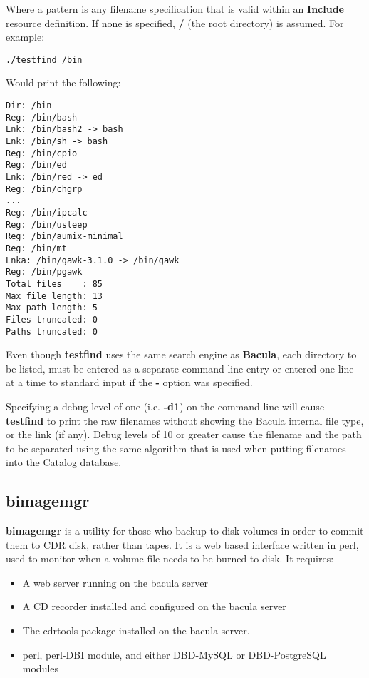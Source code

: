 Where a pattern is any filename specification that is valid within an {\bf
Include} resource definition. If none is specified, {\bf /} (the root
directory) is assumed. For example: 

\footnotesize
\begin{verbatim}
./testfind /bin
\end{verbatim}
\normalsize

Would print the following: 

\footnotesize
\begin{verbatim}
Dir: /bin
Reg: /bin/bash
Lnk: /bin/bash2 -> bash
Lnk: /bin/sh -> bash
Reg: /bin/cpio
Reg: /bin/ed
Lnk: /bin/red -> ed
Reg: /bin/chgrp
...
Reg: /bin/ipcalc
Reg: /bin/usleep
Reg: /bin/aumix-minimal
Reg: /bin/mt
Lnka: /bin/gawk-3.1.0 -> /bin/gawk
Reg: /bin/pgawk
Total files    : 85
Max file length: 13
Max path length: 5
Files truncated: 0
Paths truncated: 0
\end{verbatim}
\normalsize

Even though {\bf testfind} uses the same search engine as {\bf Bacula}, each
directory to be listed, must be entered as a separate command line entry or
entered one line at a time to standard input if the {\bf -} option was
specified. 

Specifying a debug level of one (i.e. {\bf -d1}) on the command line will
cause {\bf testfind} to print the raw filenames without showing the Bacula
internal file type, or the link (if any). Debug levels of 10 or greater cause
the filename and the path to be separated using the same algorithm that is
used when putting filenames into the Catalog database. 

\subsection*{bimagemgr}
\label{bimagemgr}

{\bf bimagemgr} is a utility for those who backup to disk volumes in order to
commit them to CDR disk, rather than tapes. It is a web based interface
written in perl, used to monitor when a volume file needs to be burned to
disk. It requires: 

\begin{itemize}
\item A web server running on the bacula server 
\item A CD recorder installed and configured on the bacula server 
\item The cdrtools package installed on the bacula server. 
\item perl, perl-DBI module, and either DBD-MySQL or DBD-PostgreSQL modules 
   \end{itemize}

